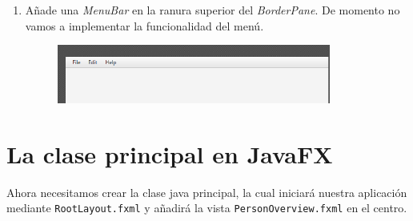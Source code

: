 \begin{enumerate}
\begin{figure}[H]
	\end{figure}
	\item Añade una \textit{MenuBar} en la ranura superior del \textit{\textit{BorderPane}}. De momento no vamos a implementar la funcionalidad del menú.
	\begin{figure}[H]
		\includegraphics[width=9cm]{img/menuBarTop}
	\end{figure}
	
\end{enumerate}
\section{La clase principal en JavaFX}
Ahora necesitamos crear la clase java principal, la cual iniciará nuestra aplicación mediante \textcolor{codigo}{\texttt{RootLayout.fxml}} y añadirá la vista \textcolor{codigo}{\texttt{PersonOverview.fxml}} en el centro.

